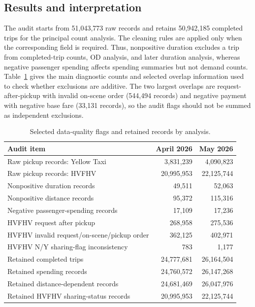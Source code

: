 \documentclass[10pt,a4paper]{article}
\begin{document}
\subsection{Results and interpretation}
The audit starts from 51,043,773 raw records and retains 50,942,185 completed trips for the principal count analysis. The cleaning rules are applied only when the corresponding field is required. Thus, nonpositive duration excludes a trip from completed-trip counts, OD analysis, and later duration analysis, whereas negative passenger spending affects spending summaries but not demand counts. Table~\ref{tab:audit} gives the main diagnostic counts and selected overlap information used to check whether exclusions are additive. The two largest overlaps are request-after-pickup with invalid on-scene order (544,494 records) and negative payment with negative base fare (33,131 records), so the audit flags should not be summed as independent exclusions.

\begin{table}[!htbp]
\centering
\caption{Selected data-quality flags and retained records by analysis.}
\label{tab:audit}
\small
\begin{tabular}{lrr}
\toprule
Audit item & April 2026 & May 2026 \\
\midrule
Raw pickup records: Yellow Taxi & 3,831,239 & 4,090,823 \\
Raw pickup records: HVFHV & 20,995,953 & 22,125,744 \\
Nonpositive duration records & 49,511 & 52,063 \\
Nonpositive distance records & 95,372 & 115,316 \\
Negative passenger-spending records & 17,109 & 17,236 \\
HVFHV request after pickup & 268,958 & 275,536 \\
HVFHV invalid request/on-scene/pickup order & 362,125 & 402,971 \\
HVFHV N/Y sharing-flag inconsistency & 783 & 1,177 \\
\midrule
Retained completed trips & 24,777,681 & 26,164,504 \\
Retained spending records & 24,760,572 & 26,147,268 \\
Retained distance-dependent records & 24,681,469 & 26,047,976 \\
Retained HVFHV sharing-status records & 20,995,953 & 22,125,744 \\
\bottomrule
\end{tabular}
\end{table}
\end{document}

